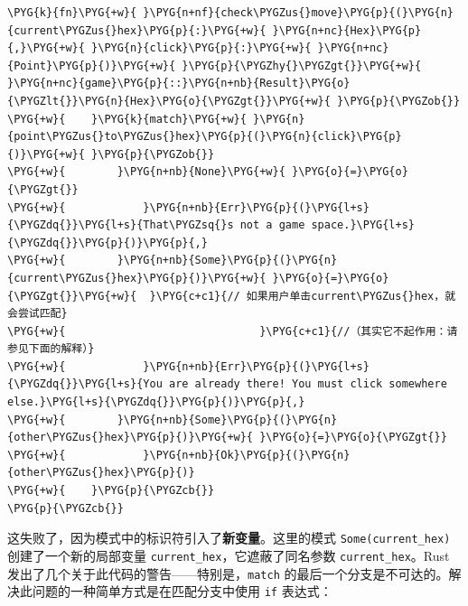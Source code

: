 \begin{Verbatim}[commandchars=\\\{\},breaklines=true,breakanywhere=true,fontsize=\codefont,xleftmargin=17bp]
\PYG{k}{fn}\PYG{+w}{ }\PYG{n+nf}{check\PYGZus{}move}\PYG{p}{(}\PYG{n}{current\PYGZus{}hex}\PYG{p}{:}\PYG{+w}{ }\PYG{n+nc}{Hex}\PYG{p}{,}\PYG{+w}{ }\PYG{n}{click}\PYG{p}{:}\PYG{+w}{ }\PYG{n+nc}{Point}\PYG{p}{)}\PYG{+w}{ }\PYG{p}{\PYGZhy{}\PYGZgt{}}\PYG{+w}{ }\PYG{n+nc}{game}\PYG{p}{::}\PYG{n+nb}{Result}\PYG{o}{\PYGZlt{}}\PYG{n}{Hex}\PYG{o}{\PYGZgt{}}\PYG{+w}{ }\PYG{p}{\PYGZob{}}
\PYG{+w}{    }\PYG{k}{match}\PYG{+w}{ }\PYG{n}{point\PYGZus{}to\PYGZus{}hex}\PYG{p}{(}\PYG{n}{click}\PYG{p}{)}\PYG{+w}{ }\PYG{p}{\PYGZob{}}
\PYG{+w}{        }\PYG{n+nb}{None}\PYG{+w}{ }\PYG{o}{=}\PYG{o}{\PYGZgt{}}
\PYG{+w}{            }\PYG{n+nb}{Err}\PYG{p}{(}\PYG{l+s}{\PYGZdq{}}\PYG{l+s}{That\PYGZsq{}s not a game space.}\PYG{l+s}{\PYGZdq{}}\PYG{p}{)}\PYG{p}{,}
\PYG{+w}{        }\PYG{n+nb}{Some}\PYG{p}{(}\PYG{n}{current\PYGZus{}hex}\PYG{p}{)}\PYG{+w}{ }\PYG{o}{=}\PYG{o}{\PYGZgt{}}\PYG{+w}{  }\PYG{c+c1}{// 如果用户单击current\PYGZus{}hex，就会尝试匹配}
\PYG{+w}{                              }\PYG{c+c1}{//（其实它不起作用：请参见下面的解释）}
\PYG{+w}{            }\PYG{n+nb}{Err}\PYG{p}{(}\PYG{l+s}{\PYGZdq{}}\PYG{l+s}{You are already there! You must click somewhere else.}\PYG{l+s}{\PYGZdq{}}\PYG{p}{)}\PYG{p}{,}
\PYG{+w}{        }\PYG{n+nb}{Some}\PYG{p}{(}\PYG{n}{other\PYGZus{}hex}\PYG{p}{)}\PYG{+w}{ }\PYG{o}{=}\PYG{o}{\PYGZgt{}}
\PYG{+w}{            }\PYG{n+nb}{Ok}\PYG{p}{(}\PYG{n}{other\PYGZus{}hex}\PYG{p}{)}
\PYG{+w}{    }\PYG{p}{\PYGZcb{}}
\PYG{p}{\PYGZcb{}}
\end{Verbatim}

这失败了，因为模式中的标识符引入了\textbf{新变量}。这里的模式 \texttt{Some(current\_hex)} 创建了一个新的局部变量 \texttt{current\_hex}，它遮蔽了同名参数 \texttt{current\_hex}。Rust 发出了几个关于此代码的警告——特别是，\texttt{match} 的最后一个分支是不可达的。解决此问题的一种简单方式是在匹配分支中使用 \texttt{if} 表达式：

